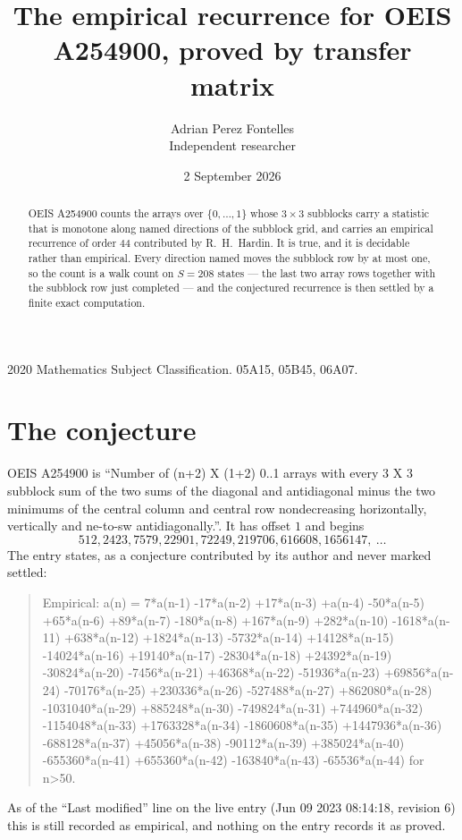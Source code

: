 \documentclass[11pt,a4paper]{article}
\title{The empirical recurrence for OEIS A254900, proved by transfer matrix}
\author{Adrian Perez Fontelles\\ \small Independent researcher}
\date{2 September 2026}
\theoremstyle{plain}
\theoremstyle{definition}
\begin{document}
\maketitle

\begin{abstract}
OEIS A254900 counts the arrays over $\{0,\dots,1\}$ whose $3\times3$ subblocks carry a
statistic that is monotone along named directions of the subblock grid, and carries an
empirical recurrence of order $44$ contributed by R.~H.~Hardin. It is true, and it is
decidable rather than empirical. Every direction named moves the subblock row by at most one,
so the count is a walk count on $S=208$ states --- the last two array rows together with the
subblock row just completed --- and the conjectured recurrence is then settled by a finite
exact computation.
\end{abstract}

\noindent\small 2020 Mathematics Subject Classification. 05A15, 05B45, 06A07.\normalsize

\section{The conjecture}

OEIS A254900 is ``Number of (n+2) X (1+2) 0..1 arrays with every 3 X 3 subblock sum of the two sums of the diagonal and antidiagonal minus the two minimums of the central column and central row nondecreasing horizontally, vertically and ne-to-sw antidiagonally.''. It has offset $1$ and begins
\[
512, 2423, 7579, 22901, 72249, 219706, 616608, 1656147,\ \dots
\]
The entry states, as a conjecture contributed by its author and never marked settled:
\begin{quote}
Empirical: a(n) = 7*a(n-1) -17*a(n-2) +17*a(n-3) +a(n-4) -50*a(n-5) +65*a(n-6) +89*a(n-7) -180*a(n-8) +167*a(n-9) +282*a(n-10) -1618*a(n-11) +638*a(n-12) +1824*a(n-13) -5732*a(n-14) +14128*a(n-15) -14024*a(n-16) +19140*a(n-17) -28304*a(n-18) +24392*a(n-19) -30824*a(n-20) -7456*a(n-21) +46368*a(n-22) -51936*a(n-23) +69856*a(n-24) -70176*a(n-25) +230336*a(n-26) -527488*a(n-27) +862080*a(n-28) -1031040*a(n-29) +885248*a(n-30) -749824*a(n-31) +744960*a(n-32) -1154048*a(n-33) +1763328*a(n-34) -1860608*a(n-35) +1447936*a(n-36) -688128*a(n-37) +45056*a(n-38) -90112*a(n-39) +385024*a(n-40) -655360*a(n-41) +655360*a(n-42) -163840*a(n-43) -65536*a(n-44) for n>50.
\end{quote}
As of the ``Last modified'' line on the live entry (Jun 09 2023 08:14:18, revision 6) this is still
recorded as empirical, and nothing on the entry records it as proved.
\end{document}
